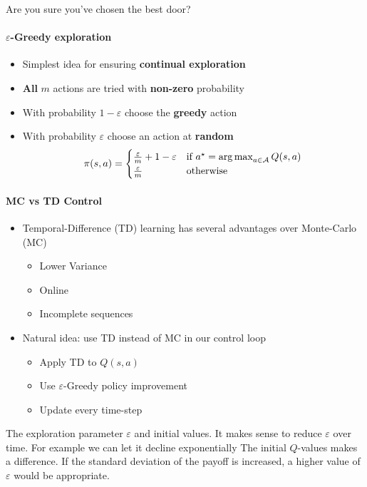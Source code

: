 Are you sure you've chosen the best door?

\paragraph{$\varepsilon$-Greedy exploration}

\begin{itemize}
    \item Simplest idea for ensuring \textbf{continual exploration}
    \item \textbf{All} $m$ actions are tried with \textbf{non-zero} probability
    \item With probability $1-\varepsilon$ choose the \textbf{greedy} action
    \item With probability $\varepsilon$ choose an action at \textbf{random}
    \[
    \pi(s, a) =
    \begin{cases}
      \frac{\varepsilon}{m}+1-\varepsilon & \text {if } a^{\star}=\operatorname*{arg\,max} _{a \in \mathcal{A}} Q(s, a) \\
      \frac{\varepsilon}{m} & \text {otherwise}
    \end{cases}
    \]
\end{itemize}


\paragraph{MC vs TD Control}
\begin{itemize}
    \item Temporal-Difference (TD) learning has several advantages over Monte-Carlo (MC)
    \begin{itemize}
        \item Lower Variance
        \item Online
        \item Incomplete sequences
    \end{itemize}
    \item Natural idea: use TD instead of MC in our control loop
    \begin{itemize}
        \item Apply TD to $Q(s, a)$
        \item Use $\varepsilon$-Greedy policy improvement
        \item Update every time-step
    \end{itemize}
\end{itemize}

The exploration parameter $\varepsilon$ and initial values. It makes sense to reduce $\varepsilon$ over time. For example we can let it decline exponentially
The initial $Q$-values makes a difference.
If the standard deviation of the payoff is increased, a higher value of $\varepsilon$ would be appropriate.

